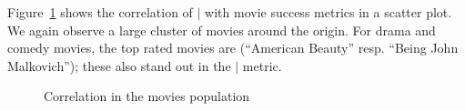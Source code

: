 			
			Figure~\ref{fig:Movies} shows the correlation of $\mid$ with movie success metrics in a scatter plot. We again observe a large cluster of movies around the origin. For drama and comedy movies, the top rated movies are (``American Beauty'' resp. ``Being John Malkovich''); these also stand out in the $\mid$ metric. 
			
			
			\begin{figure}
				\centering     %
				\caption{Correlation in the movies population\label{fig:Movies}}
			\end{figure}
			
